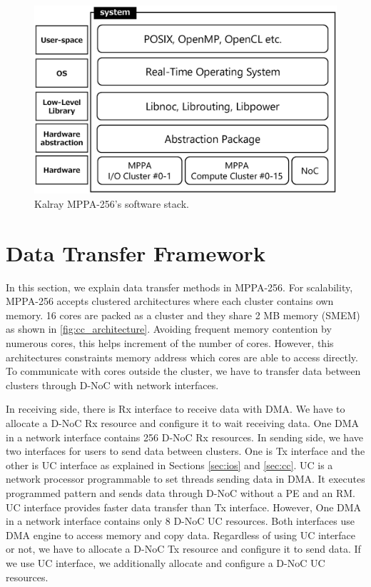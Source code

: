 \documentclass{sig-alternate-05-2015}
\begin{document}
\begin{figure}[t]
  \centering
  \includegraphics[width=1.0\linewidth]{../figure/softwarestack.eps}
  \caption{\label{fig:software_stack}
    Kalray MPPA-256's software stack.}
\end{figure}


\section{Data Transfer Framework}
\label{sec:framework}
In this section, we explain data transfer methods in MPPA-256.
For scalability, MPPA-256 accepts clustered architectures where each cluster contains own memory.
16 cores are packed as a cluster and they share 2 MB memory (SMEM) as shown in \ref{fig:cc_architecture}.
Avoiding frequent memory contention by numerous cores, this helps increment of the number of cores.
However, this architectures constraints memory address which cores are able to access directly.
To communicate with cores outside the cluster, we have to transfer data between clusters through D-NoC with network interfaces.

In receiving side, there is Rx interface to receive data with DMA.
We have to allocate a D-NoC Rx resource and configure it to wait receiving data.
One DMA in a network interface contains 256 D-NoC Rx resources.
In sending side, we have two interfaces for users to send data between clusters.
One is Tx interface and the other is UC interface as explained in Sections \ref{sec:ios} and \ref{sec:cc}.
UC is a network processor programmable to set threads sending data in DMA.
It executes programmed pattern and sends data through D-NoC without a PE and an RM.
UC interface provides faster data transfer than Tx interface.
However, One DMA in a network interface contains only 8 D-NoC UC resources.
Both interfaces use DMA engine to access memory and copy data.
Regardless of using UC interface or not, we have to allocate a D-NoC Tx resource and configure it to send data.
If we use UC interface, we additionally allocate and configure a D-NoC UC resources.
\end{document}

